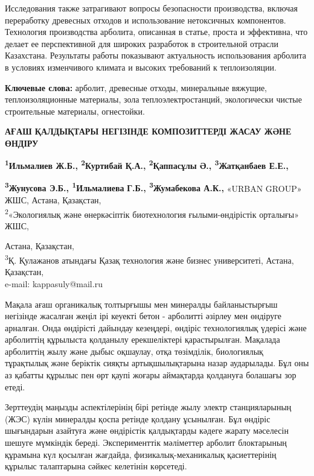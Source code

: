 Исследования также затрагивают вопросы безопасности производства,
включая переработку древесных отходов и использование нетоксичных
компонентов. Технология производства арболита, описанная в статье,
проста и эффективна, что делает ее перспективной для широких разработок
в строительной отрасли Казахстана. Результаты работы показывают
актуальность использования арболита в условиях изменчивого климата и
высоких требований к теплоизоляции.

{\bfseries Ключевые слова:} арболит, древесные отходы, минеральные вяжущие,
теплоизоляционные материалы, зола теплоэлектростанций, экологически
чистые строительные материалы, огнестойки.

{\bfseries АҒАШ ҚАЛДЫҚТАРЫ НЕГІЗІНДЕ КОМПОЗИТТЕРДІ ЖАСАУ ЖӘНЕ ӨНДІРУ}

{\bfseries \textsuperscript{1}Ильмалиев Ж.Б., \textsuperscript{2}Куртибай
Қ.А., \textsuperscript{2}Қаппасұлы Ә.\textsuperscript{\envelope },
\textsuperscript{3}Жатқанбаев Е.Е.,}

{\bfseries \textsuperscript{3}Жунусова Э.Б., \textsuperscript{1}Ильмалиева}
{\bfseries Г.Б., \textsuperscript{3}Жумабекова А.К.,}
\textsuperscript{\hfill{}}«URBAN GROUP» ЖШС, Астана, Қазақстан,\\
\textsuperscript{2}«Экологиялық және өнеркәсіптік биотехнология
ғылыми-өндірістік орталығы» ЖШС,

Астана, Қазақстан,\\
\textsuperscript{3}Қ. Қулажанов атындағы Қазақ технология және бизнес
университеті, Астана, Қазақстан,\\
e-mail: kappasuly@mail.ru

Мақала ағаш органикалық толтырғышы мен минералды байланыстырғыш
негізінде жасалған жеңіл ірі кеуекті бетон - арболитті әзірлеу мен
өндіруге арналған. Онда өндірісті дайындау кезеңдері, өндіріс
технологиялық үдерісі және арболиттің құрылыста қолданылу ерекшеліктері
қарастырылған. Мақалада арболиттің жылу және дыбыс оқшаулау, отқа
төзімділік, биологиялық тұрақтылық және беріктік сияқты артықшылықтарына
назар аударылады. Бұл оны аз қабатты құрылыс пен өрт қаупі жоғары
аймақтарда қолдануға болашағы зор етеді.

Зерттеудің маңызды аспектілерінің бірі ретінде жылу электр
станцияларының (ЖЭС) күлін минералды қоспа ретінде қолдану ұсынылған.
Бұл өндіріс шығындарын азайтуға және өндірістік қалдықтарды кәдеге
жарату мәселесін шешуге мүмкіндік береді. Эксперименттік мәліметтер
арболит блоктарының құрамына күл қосылған жағдайда,
физикалық-механикалық қасиеттерінің құрылыс талаптарына сәйкес келетінін
көрсетеді.

